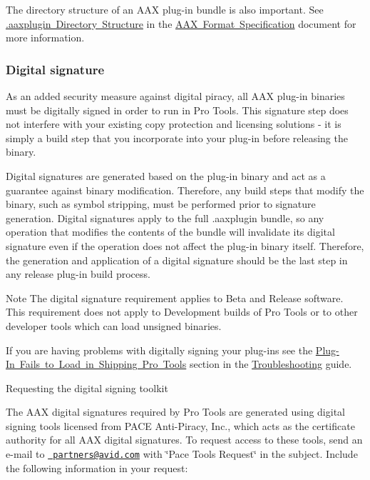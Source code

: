 The directory structure of an A\+AX plug-\/in bundle is also important. See \mbox{\hyperlink{a00801_commoninterface_formatspecification__aaxplugin_directory_structure}{.aaxplugin Directory Structure}} in the \mbox{\hyperlink{a00801}{A\+AX Format Specification}} document for more information.

\hypertarget{a00830_subsection__digital_signature_}{}\subsubsection{Digital signature}\label{a00830_subsection__digital_signature_}
 As an added security measure against digital piracy, all A\+AX plug-\/in binaries must be digitally signed in order to run in Pro Tools. This signature step does not interfere with your existing copy protection and licensing solutions -\/ it is simply a build step that you incorporate into your plug-\/in before releasing the binary.

Digital signatures are generated based on the plug-\/in binary and act as a guarantee against binary modification. Therefore, any build steps that modify the binary, such as symbol stripping, must be performed prior to signature generation. Digital signatures apply to the full .aaxplugin bundle, so any operation that modifies the contents of the bundle will invalidate its digital signature even if the operation does not affect the plug-\/in binary itself. Therefore, the generation and application of a digital signature should be the last step in any release plug-\/in build process.

\begin{DoxyNote}{Note}
The digital signature requirement applies to Beta and Release software. This requirement does not apply to Development builds of Pro Tools or to other developer tools which can load unsigned binaries.
\end{DoxyNote}
If you are having problems with digitally signing your plug-\/ins see the \mbox{\hyperlink{a00842_troubleshooting_signature}{Plug-\/\+In Fails to Load in Shipping Pro Tools}} section in the \mbox{\hyperlink{a00842}{Troubleshooting}} guide.

 Requesting the digital signing toolkit

The A\+AX digital signatures required by Pro Tools are generated using digital signing tools licensed from P\+A\+CE Anti-\/\+Piracy, Inc., which acts as the certificate authority for all A\+AX digital signatures. To request access to these tools, send an e-\/mail to \href{mailto:partners@avid.com?subject=Pace Tools Request}{\texttt{ partners@avid.\+com}} with \char`\"{}\+Pace Tools Request\char`\"{} in the subject. Include the following information in your request\+:



